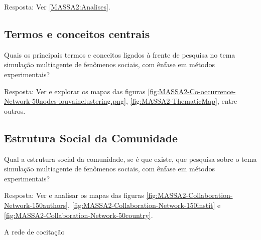 Resposta: Ver \ref{MASSA2:Analises}.

\subsection{Termos e conceitos centrais}

Quais os principais termos e conceitos ligados à frente de pesquisa no tema simulação multiagente de fenômenos sociais, com ênfase em métodos experimentais? 

Resposta: Ver e explorar os mapas das figuras \ref{fig:MASSA2-Co-occurrence-Network-50nodes-louvainclustering.png}, \ref{fig:MASSA2-ThematicMap}, entre outros.

\subsection{Estrutura Social da Comunidade}

Qual a estrutura social da comunidade, se é que existe, que pesquisa sobre o tema simulação multiagente de fenômenos sociais, com ênfase em métodos experimentais?

Resposta: Ver e analisar os mapas das figuras \ref{fig:MASSA2-Collaboration-Network-150authors}, \ref{fig:MASSA2-Collaboration-Network-150instit} e \ref{fig:MASSA2-Collaboration-Network-50country}.

A rede de cocitação 